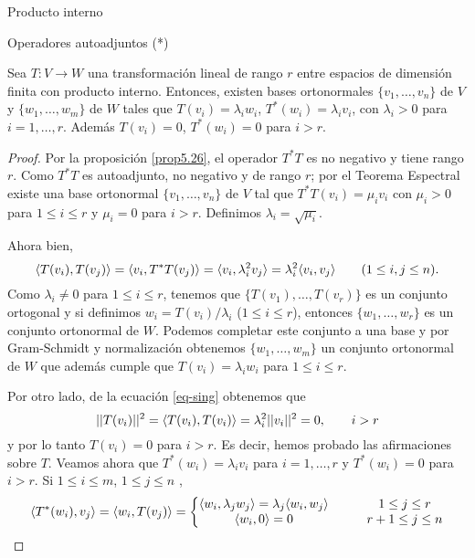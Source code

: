 \begin{chapter}{Producto interno}
\begin{section}{Operadores autoadjuntos (*)}
        \begin{teorema}\label{teorema-de-los-valores-singulares}
            Sea $T: V \to W$ una transformación lineal de rango $r$ entre espacios de dimensión finita 	con producto interno. Entonces, existen bases ortonormales $\{v_1,\ldots,v_n\}$ de $V$ y $\{w_1,\ldots,w_m\}$ de $W$ tales que $T(v_i) = \lambda_i w_i$,  $T^*(w_i) = \lambda_i v_i$, con $\lambda_i >0$ para $i=1,\ldots,r$. Además $T(v_i) = 0$,  $T^*(w_i) = 0$ para $i > r$. 
        \end{teorema}
        \begin{proof}
            Por la  proposición  \ref{prop5.26},  el operador $T^*T$ es no negativo y tiene rango  $r$. Como  $T^*T$  es autoadjunto, no negativo y  de rango  $r$; por el Teorema Espectral existe una base ortonormal $\{v_1,\ldots,v_n\}$ de $V$ tal que $T^*T(v_i) = \mu_i v_i$ con $\mu_i >0$ para $1 \le i \le r$ y  $\mu_i = 0$ para $i>r$. Definimos $\lambda_i = \sqrt{\mu_i}$. 
            
            Ahora bien,
            \begin{equation}\label{eq-sing}
                \langle T(v_i),T(v_j) \rangle = \langle v_i,T^*T(v_j) \rangle = \langle v_i, \lambda_i^2 v_j \rangle  = \lambda_i^2\langle v_i,  v_j \rangle\qquad (1\le i,j \le n).
            \end{equation}
            Como $\lambda_i \ne 0$ para $1 \le i \le r$, tenemos que $\{T(v_1),\ldots,T(v_r)\}$ es un conjunto ortogonal y si definimos $w_i = T(v_i)/\lambda_i$ ($1 \le i \le r$), entonces $\{w_1,\ldots,w_r\}$ es un conjunto ortonormal de $W$. Podemos completar este conjunto a una base y por  Gram-Schmidt y  normalización obtenemos $\{w_1,\ldots,w_m\}$ un conjunto ortonormal de $W$ que además cumple  que $T(v_i) = \lambda_i w_i$ para   $1 \le i \le r$.
            
            Por otro lado,  de la ecuación \eqref{eq-sing} obtenemos que 
            $$
            ||T(v_i)||^2 = \langle T(v_i),T(v_i) \rangle = \lambda_i^2||v_i||^2 = 0, \qquad i>r
            $$     
            y por lo tanto $T(v_i)=0$ para $i>r$.  Es decir, hemos probado las afirmaciones sobre $T$. Veamos ahora que $T^*(w_i) = \lambda_i v_i$ para $i=1,\ldots,r$ y $T^*(w_i) = 0$ para $i > r$. Si $ 1 \le i \le m$, $ 1 \le j \le n$ ,
            $$
            \langle T^*(w_i),v_j \rangle = \langle w_i,T(v_j) \rangle = \left\{
            \begin{matrix}
            \langle w_i,\lambda_j w_j \rangle = \lambda_j\langle w_i,w_j \rangle&\quad&1 \le j \le r \\
            \langle w_i,0 \rangle = 0&\quad&r+1 \le j \le n 
            \end{matrix}
            \right.
            $$
        \end{proof}
         

\end{section}
\end{chapter}
